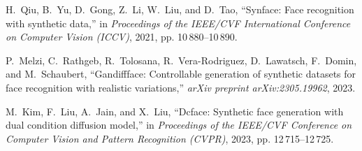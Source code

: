 \documentclass[journal]{IEEEtran}
\begin{document}
\begin{thebibliography}{100}
H.~Qiu, B.~Yu, D.~Gong, Z.~Li, W.~Liu, and D.~Tao, ``Synface: Face recognition
  with synthetic data,'' in \emph{Proceedings of the IEEE/CVF International Conference on Computer Vision (ICCV)}, 2021, pp. 10\,880--10\,890.

P.~Melzi, C.~Rathgeb, R.~Tolosana, R.~Vera-Rodriguez, D.~Lawatsch, F.~Domin,
  and M.~Schaubert, ``Gandiffface: Controllable generation of synthetic datasets for face recognition with realistic variations,'' \emph{arXiv
  preprint arXiv:2305.19962}, 2023.

M.~Kim, F.~Liu, A.~Jain, and X.~Liu, ``Dcface: Synthetic face generation with dual condition diffusion model,'' in \emph{Proceedings of the IEEE/CVF Conference on Computer Vision and Pattern Recognition (CVPR)}, 2023, pp.
  12\,715--12\,725.

\end{thebibliography}



\end{document}
